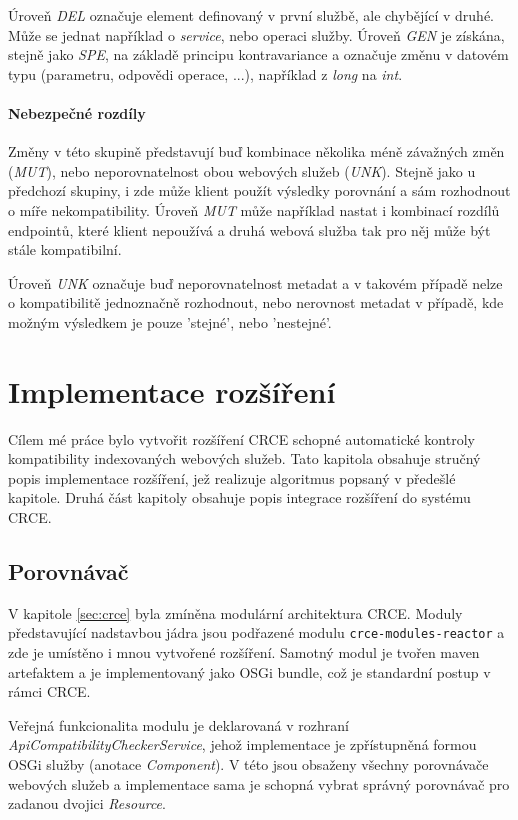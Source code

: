 \documentclass[czech,DP]{thesiskiv}
\begin{document}
Úroveň \textit{DEL} označuje element definovaný v první službě, ale chybějící v druhé. Může se jednat například o \textit{service}, nebo operaci služby. Úroveň \textit{GEN} je získána, stejně jako \textit{SPE}, na základě principu kontravariance a označuje změnu v datovém typu (parametru, odpovědi operace, ...), například z \textit{long} na \textit{int}. 

\subsubsection{Nebezpečné rozdíly}

Změny v této skupině představují buď kombinace několika méně závažných změn (\textit{MUT}), nebo neporovnatelnost obou webových služeb (\textit{UNK}). Stejně jako u předchozí skupiny, i zde může klient použít výsledky porovnání a sám rozhodnout o míře nekompatibility. Úroveň \textit{MUT} může například nastat i kombinací rozdílů endpointů, které klient nepoužívá a druhá webová služba tak pro něj může být stále kompatibilní.

Úroveň \textit{UNK} označuje buď neporovnatelnost metadat a v takovém případě nelze o kompatibilitě jednoznačně rozhodnout, nebo nerovnost metadat v případě, kde možným výsledkem je pouze 'stejné', nebo 'nestejné'.


\chapter{Implementace rozšíření}

Cílem mé práce bylo vytvořit rozšíření CRCE schopné automatické kontroly kompatibility indexovaných webových služeb. Tato kapitola obsahuje stručný popis implementace rozšíření, jež realizuje algoritmus popsaný v předešlé kapitole. Druhá část kapitoly obsahuje popis integrace rozšíření do systému CRCE.

\section{Porovnávač}

V kapitole \ref{sec:crce} byla zmíněna modulární architektura CRCE. Moduly představující nadstavbou jádra jsou podřazené modulu \verb|crce-modules-reactor| a zde je umístěno i mnou vytvořené rozšíření. Samotný modul je tvořen maven artefaktem a je implementovaný jako OSGi bundle, což je standardní postup v rámci CRCE.

Veřejná funkcionalita modulu je deklarovaná v rozhraní \textit{ApiCompatibilityCheckerService}, jehož implementace je zpřístupněná formou OSGi služby (anotace \textit{Component}). V této jsou obsaženy všechny porovnávače webových služeb a implementace sama je schopná vybrat správný porovnávač pro zadanou dvojici \textit{Resource}.
\end{document}
